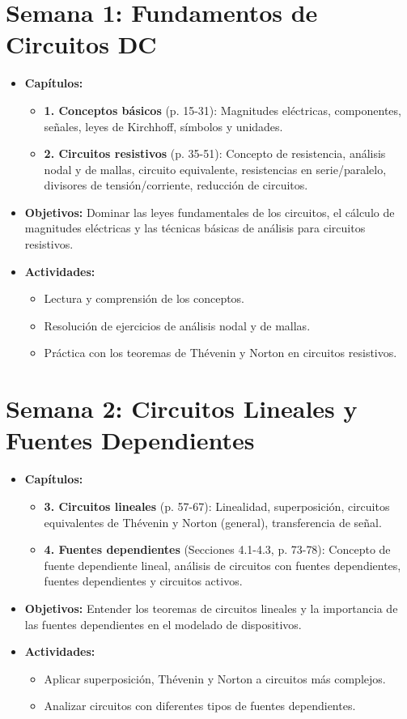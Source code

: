\documentclass[12pt,a4paper]{article}
\begin{document}
\section{Semana 1: Fundamentos de Circuitos DC}
\begin{itemize}
    \item \textbf{Capítulos:}
    \begin{itemize}
        \item \textbf{1. Conceptos básicos} (p. 15-31): Magnitudes eléctricas, componentes, señales, leyes de Kirchhoff, símbolos y unidades.
        \item \textbf{2. Circuitos resistivos} (p. 35-51): Concepto de resistencia, análisis nodal y de mallas, circuito equivalente, resistencias en serie/paralelo, divisores de tensión/corriente, reducción de circuitos.
    \end{itemize}
    \item \textbf{Objetivos:} Dominar las leyes fundamentales de los circuitos, el cálculo de magnitudes eléctricas y las técnicas básicas de análisis para circuitos resistivos.
    \item \textbf{Actividades:}
    \begin{itemize}
        \item Lectura y comprensión de los conceptos.
        \item Resolución de ejercicios de análisis nodal y de mallas.
        \item Práctica con los teoremas de Thévenin y Norton en circuitos resistivos.
    \end{itemize}
\end{itemize}

\section{Semana 2: Circuitos Lineales y Fuentes Dependientes}
\begin{itemize}
    \item \textbf{Capítulos:}
    \begin{itemize}
        \item \textbf{3. Circuitos lineales} (p. 57-67): Linealidad, superposición, circuitos equivalentes de Thévenin y Norton (general), transferencia de señal.
        \item \textbf{4. Fuentes dependientes} (Secciones 4.1-4.3, p. 73-78): Concepto de fuente dependiente lineal, análisis de circuitos con fuentes dependientes, fuentes dependientes y circuitos activos.
    \end{itemize}
    \item \textbf{Objetivos:} Entender los teoremas de circuitos lineales y la importancia de las fuentes dependientes en el modelado de dispositivos.
    \item \textbf{Actividades:}
    \begin{itemize}
        \item Aplicar superposición, Thévenin y Norton a circuitos más complejos.
        \item Analizar circuitos con diferentes tipos de fuentes dependientes.
    \end{itemize}
\end{itemize}
\end{document}
